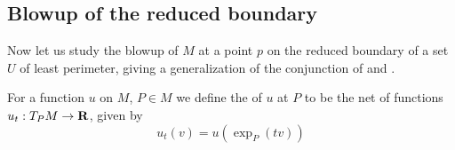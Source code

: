 
\subsection{Blowup of the reduced boundary}
Now let us study the blowup of $M$ at a point $p$ on the reduced boundary of a set $U$ of least perimeter, giving a generalization of the conjunction of \cite[Theorem 9.3]{Giusti77} and \cite[Theorem 6.2.2]{Simons68}.

\begin{definition}
For a function $u$ on $M$, $P \in M$ we define the  of $u$ at $P$ to be the net of functions $u_t: T_PM \to \mathbf{R}$, given by
$$u_t(v) = u\left(\exp_P(tv)\right)$$
\end{definition}

